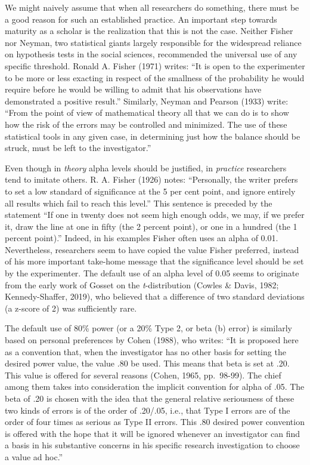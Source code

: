 \documentclass[
  english,
  ,man, a4paper,floatsintext]{apa6}
\begin{document}
We might naively assume that when all researchers do something, there must be a good reason for such an established practice. An important step towards maturity as a scholar is the realization that this is not the case. Neither Fisher nor Neyman, two statistical giants largely responsible for the widespread reliance on hypothesis tests in the social sciences, recommended the universal use of any specific threshold. Ronald A. Fisher (1971) writes: ``It is open to the experimenter to be more or less exacting in respect of the smallness of the probability he would require before he would be willing to admit that his observations have demonstrated a positive result.'' Similarly, Neyman and Pearson (1933) write: ``From the point of view of mathematical theory all that we can do is to show how the risk of the errors may be controlled and minimized. The use of these statistical tools in any given case, in determining just how the balance should be struck, must be left to the investigator.''

Even though in \emph{theory} alpha levels should be justified, in \emph{practice} researchers tend to imitate others. R. A. Fisher (1926) notes: ``Personally, the writer prefers to set a low standard of significance at the 5 per cent point, and ignore entirely all results which fail to reach this level.'' This sentence is preceded by the statement ``If one in twenty does not seem high enough odds, we may, if we prefer it, draw the line at one in fifty (the 2 percent point), or one in a hundred (the 1 percent point).'' Indeed, in his examples Fisher often uses an alpha of 0.01. Nevertheless, researchers seem to have copied the value Fisher preferred, instead of his more important take-home message that the significance level should be set by the experimenter. The default use of an alpha level of 0.05 seems to originate from the early work of Gosset on the \emph{t}-distribution (Cowles \& Davis, 1982; Kennedy-Shaffer, 2019), who believed that a difference of two standard deviations (a z-score of 2) was sufficiently rare.

The default use of 80\% power (or a 20\% Type 2, or beta (b) error) is similarly based on personal preferences by Cohen (1988), who writes: ``It is proposed here as a convention that, when the investigator has no other basis for setting the desired power value, the value .80 be used. This means that beta is set at .20. This value is offered for several reasons (Cohen, 1965, pp.~98-99). The chief among them takes into consideration the implicit convention for alpha of .05. The beta of .20 is chosen with the idea that the general relative seriousness of these two kinds of errors is of the order of .20/.05, i.e., that Type I errors are of the order of four times as serious as Type II errors. This .80 desired power convention is offered with the hope that it will be ignored whenever an investigator can find a basis in his substantive concerns in his specific research investigation to choose a value ad hoc.''
\end{document}
